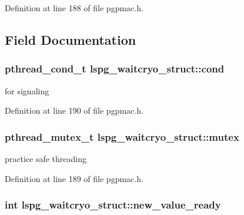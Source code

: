 Definition at line 188 of file pgpmac.\-h.



\subsection{Field Documentation}
\hypertarget{structlspg__waitcryo__struct_a54c275159d9f096e0d1884e64d099298}{
\subsubsection[{cond}]{\setlength{\rightskip}{0pt plus 5cm}pthread\-\_\-cond\-\_\-t lspg\-\_\-waitcryo\-\_\-struct\-::cond}}\label{structlspg__waitcryo__struct_a54c275159d9f096e0d1884e64d099298}


for signaling 



Definition at line 190 of file pgpmac.\-h.

\hypertarget{structlspg__waitcryo__struct_a62b50ead380fc8a6be35956eba384ba6}{
\subsubsection[{mutex}]{\setlength{\rightskip}{0pt plus 5cm}pthread\-\_\-mutex\-\_\-t lspg\-\_\-waitcryo\-\_\-struct\-::mutex}}\label{structlspg__waitcryo__struct_a62b50ead380fc8a6be35956eba384ba6}


practice safe threading 



Definition at line 189 of file pgpmac.\-h.

\hypertarget{structlspg__waitcryo__struct_a97298b773fd8c1f2ef20159093a08246}{
\subsubsection[{new\-\_\-value\-\_\-ready}]{\setlength{\rightskip}{0pt plus 5cm}int lspg\-\_\-waitcryo\-\_\-struct\-::new\-\_\-value\-\_\-ready}}\label{structlspg__waitcryo__struct_a97298b773fd8c1f2ef20159093a08246}


